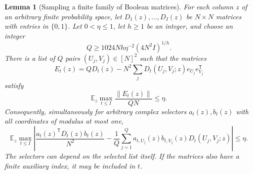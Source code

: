 \documentclass[11pt,letterpaper]{article}
\newtheorem{lemma}[theorem]{Lemma}
\theoremstyle{definition}
\theoremstyle{remark}
\newcommand{\E}{\mathbb E}
\begin{document}
\begin{lemma}[Sampling a finite family of Boolean matrices]
\label{samp:moment}
For each column $z$ of an arbitrary finite probability space, let
$D_1(z),\ldots,D_I(z)$ be $N\times N$ matrices with entries in
$\{0,1\}$. Let $0<\eta\le1$, let $h\ge1$ be an integer, and choose
an integer
\begin{equation}
Q\ge 1024Nh\eta^{-2}(4N^2I)^{1/h}.
\label{samp:q}
\end{equation}
There is a list of $Q$ pairs $(U_j,V_j)\in[N]^2$ such that the matrices
\[
E_t(z)=QD_t(z)-N^2\sum_jD_t(U_j,V_j;z)e_{U_j}e_{V_j}^{\mathsf T}
\]
satisfy
\[
\E_z\max_{t\le I}\frac{\|E_t(z)\|}{QN}\le\eta.
\]
Consequently, simultaneously for arbitrary complex selectors $a_t(z),b_t(z)$ with
all coordinates of modulus at most one,
\begin{equation}
\E_z\max_{t\le I}\left|
\frac{a_t(z)^{\mathsf T}D_t(z)b_t(z)}{N^2}
-\frac1Q\sum_{j=1}^Q a_{t,U_j}(z)b_{t,V_j}(z)
                                  D_t(U_j,V_j;z)\right|\le\eta.
\label{samp:universal}
\end{equation}
The selectors can depend on the selected list itself. If the matrices
also have a finite auxiliary index, it may be included in $t$.
\end{lemma}
\end{document}
